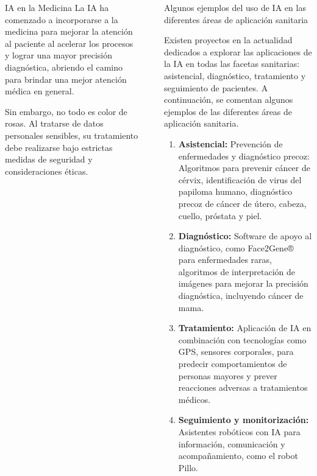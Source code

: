 \documentclass[final]{beamer}
\newlength{\sepwidth}
\newlength{\colwidth}
\newcommand{\separatorcolumn}{\begin{column}{\sepwidth}\end{column}}
\begin{document}
\begin{frame}[t]
\begin{columns}[t]
\begin{column}{\colwidth}
\begin{alertblock}{IA en la Medicina}
    La IA ha comenzado a incorporarse a la medicina para mejorar la atención al paciente al acelerar los procesos y lograr una mayor precisión diagnóstica, abriendo el camino para brindar una mejor atención médica en general. 

    Sin embargo, no todo es color de rosas. Al tratarse de datos personales sensibles, su tratamiento debe realizarse bajo estrictas medidas de seguridad y consideraciones éticas. 
    


  \end{alertblock}

\end{column}

\separatorcolumn

\begin{column}{\colwidth}

  \begin{block}{Algunos ejemplos del uso de IA en las diferentes áreas de aplicación sanitaria}

    Existen proyectos en la actualidad dedicados a explorar las aplicaciones de la IA en todas las facetas sanitarias: asistencial, diagnóstico, tratamiento y seguimiento de pacientes. A continuación, se comentan algunos ejemplos de las diferentes áreas de aplicación sanitaria.
    
    \begin{enumerate}
      \item \textbf{Asistencial:} Prevención de enfermedades y diagnóstico precoz: Algoritmos para prevenir cáncer de cérvix, identificación de virus del papiloma humano, diagnóstico precoz de cáncer de útero, cabeza, cuello, próstata y piel.      
      \item \textbf{Diagnóstico:}	Software de apoyo al diagnóstico, como Face2Gene® para enfermedades raras, algoritmos de interpretación de imágenes para mejorar la precisión diagnóstica, incluyendo cáncer de mama.
      \item \textbf{Tratamiento:}	Aplicación de IA en combinación con tecnologías como GPS, sensores corporales, para predecir comportamientos de personas mayores y prever reacciones adversas a tratamientos médicos.
      \item \textbf{Seguimiento y monitorización:} Asistentes robóticos con IA para información, comunicación y acompañamiento, como el robot Pillo.\cite{lanzagorta-ortega_inteligencia_2023}
    \end{enumerate}

  \end{block}


\end{column}
\end{columns}
\end{frame}
\end{document}
